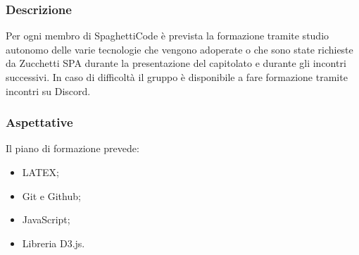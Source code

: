 \documentclass[../norme-di-progetto.tex]{subfiles}
\begin{document}
    \subsubsection{Descrizione}
    Per ogni membro di SpaghettiCode è prevista la formazione tramite studio autonomo delle varie tecnologie che vengono adoperate o che sono state richieste da Zucchetti SPA durante la presentazione del capitolato e durante gli incontri successivi. In caso di difficoltà il gruppo è disponibile a fare formazione tramite incontri su Discord.
    \subsubsection{Aspettative}
    Il piano di formazione prevede:
    \begin{itemize}
        \item LATEX;
        \item Git e Github;
        \item JavaScript;
        \item Libreria D3.js.
    \end{itemize}
\end{document}
